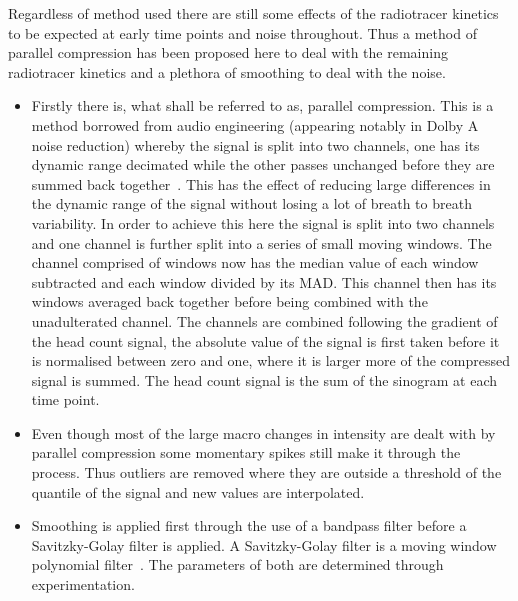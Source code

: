                     Regardless of method used there are still some effects of the radiotracer kinetics to be expected at early time points and noise throughout. Thus a method of parallel compression has been proposed here to deal with the remaining radiotracer kinetics and a plethora of smoothing to deal with the noise.
                    
                    \begin{itemize}
                        \item Firstly there is, what shall be referred to as, parallel compression. This is a method borrowed from audio engineering (appearing notably in Dolby A noise reduction) whereby the signal is split into two channels, one has its dynamic range decimated while the other passes unchanged before they are summed back together~\parencite{Izhaki2012MixingTools}. This has the effect of reducing large differences in the dynamic range of the signal without losing a lot of breath to breath variability. In order to achieve this here the signal is split into two channels and one channel is further split into a series of small moving windows. The channel comprised of windows now has the median value of each window subtracted and each window divided by its \gls{MAD}. This channel then has its windows averaged back together before being combined with the unadulterated channel. The channels are combined following the gradient of the head count signal, the absolute value of the signal is first taken before it is normalised between zero and one, where it is larger more of the compressed signal is summed. The head count signal is the sum of the sinogram at each time point.
                        
                        \item Even though most of the large macro changes in intensity are dealt with by parallel compression some momentary spikes still make it through the process. Thus outliers are removed where they are outside a threshold of the quantile of the signal and new values are interpolated.
                        
                        \item Smoothing is applied first through the use of a bandpass filter before a Savitzky-Golay filter is applied. A Savitzky-Golay filter is a moving window polynomial filter~\parencite{Savitzky1964SmoothingProcedures}. The parameters of both are determined through experimentation.
                    \end{itemize}
            
